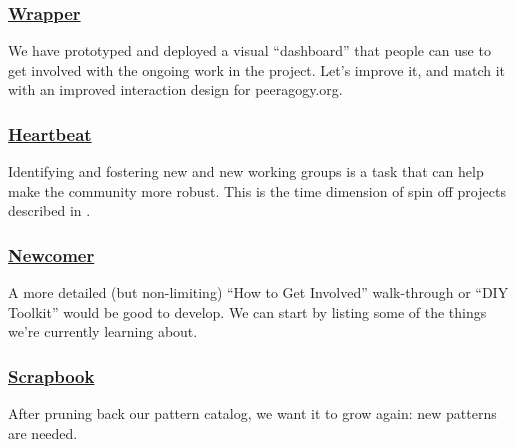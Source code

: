 \subsubsection*{\hyperref[sec:Wrapper]{Wrapper}}
We have prototyped and deployed a visual ``dashboard'' that people can use to get involved with the ongoing work in the project.  Let's improve it, and match it with an improved interaction design for peeragogy.org.

\subsubsection*{\hyperref[sec:Heartbeat]{Heartbeat}} Identifying and fostering new  and new working groups is a task that can help make the community more robust.  This is the time dimension of spin off projects described in .

\subsubsection*{\hyperref[sec:Newcomer]{Newcomer}} A more detailed (but non-limiting) ``How to Get Involved'' walk-through or ``DIY Toolkit'' would be good to develop. We can start by listing some of the things we're currently learning about.

\subsubsection*{\hyperref[sec:Scrapbook]{Scrapbook}} 
After pruning back our pattern catalog, we want it to grow again: new patterns are needed.



